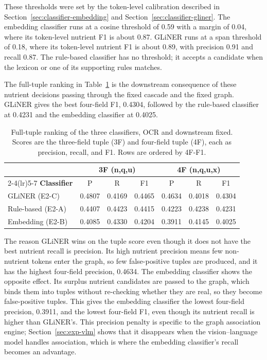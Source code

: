 These thresholds were set by the token-level calibration described in
Section~\ref{sec:classifier-embedding} and
Section~\ref{sec:classifier-gliner}. The embedding classifier runs at a
cosine threshold of 0.59 with a margin of 0.04, where its token-level
nutrient F1 is about 0.87. GLiNER runs at a span threshold of 0.18, where
its token-level nutrient F1 is about 0.89, with precision 0.91 and recall
0.87. The rule-based classifier has no threshold; it accepts a candidate
when the lexicon or one of its supporting rules matches.

The full-tuple ranking in Table~\ref{tab:classifier-tuple} is the
downstream consequence of these nutrient decisions passing through the
fixed cascade and the fixed graph. GLiNER gives the best four-field F1,
0.4304, followed by the rule-based classifier at 0.4231 and the embedding
classifier at 0.4025.

\begin{table}[htbp]
  \centering
  \caption[Classifier axis: full-tuple ranking]{Full-tuple ranking of the
    three classifiers, OCR and downstream fixed. Scores are the
    three-field tuple (3F) and four-field tuple (4F), each as precision,
    recall, and F1. Rows are ordered by 4F-F1.}
  \label{tab:classifier-tuple}
  \small
  \begin{tabular}{@{}lcccccc@{}}
    \toprule
     & \multicolumn{3}{c}{\textbf{3F (n,q,u)}} & \multicolumn{3}{c}{\textbf{4F (n,q,u,x)}} \\
    \cmidrule(lr){2-4}\cmidrule(lr){5-7}
    \textbf{Classifier} & P & R & F1 & P & R & F1 \\
    \midrule
    GLiNER (E2-C)     & 0.4807 & 0.4169 & 0.4465 & 0.4634 & 0.4018 & 0.4304 \\
    Rule-based (E2-A) & 0.4407 & 0.4423 & 0.4415 & 0.4223 & 0.4238 & 0.4231 \\
    Embedding (E2-B)  & 0.4085 & 0.4330 & 0.4204 & 0.3911 & 0.4145 & 0.4025 \\
    \bottomrule
  \end{tabular}
\end{table}

The reason GLiNER wins on the tuple score even though it does not have the
best nutrient recall is precision. Its high nutrient precision means few
non-nutrient tokens enter the graph, so few false-positive tuples are
produced, and it has the highest four-field precision, 0.4634. The
embedding classifier shows the opposite effect. Its surplus nutrient
candidates are passed to the graph, which binds them into tuples without
re-checking whether they are real, so they become false-positive tuples.
This gives the embedding classifier the lowest four-field precision,
0.3911, and the lowest four-field F1, even though its nutrient recall is
higher than GLiNER's. This precision penalty is specific to the graph
association engine; Section~\ref{sec:exp-vlm} shows that it disappears when
the vision--language model handles association, which is where the
embedding classifier's recall becomes an advantage.

